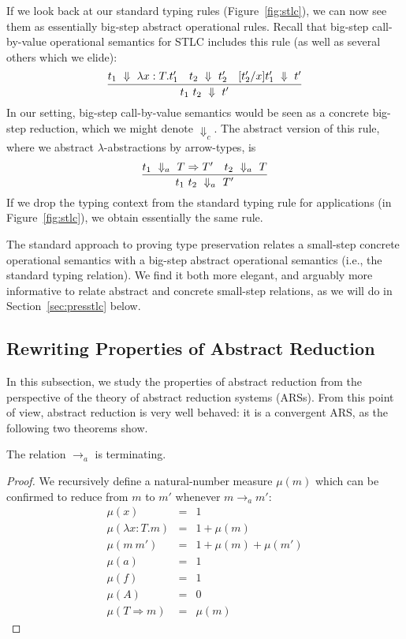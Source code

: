 \documentclass{LMCS}
\newcommand{\To}[0]{\Rightarrow}
\begin{document}
If we look back at our standard typing rules (Figure~\ref{fig:stlc}),
we can now see them as essentially big-step abstract operational
rules.  Recall that big-step call-by-value operational semantics for
STLC includes this rule (as well as several others which we elide):
\[
\infer{t_1\ t_2\ \Downarrow\ t'}{t_1\ \Downarrow\ \lambda x:T.t_1' & t_2\ \Downarrow\ t_2' & [t_2'/x]t_1'\ \Downarrow\ t'}
\]
\noindent In our setting, big-step call-by-value semantics would be
seen as a concrete big-step reduction, which we might denote
$\Downarrow_c$.  The abstract version of this rule, where we abstract
$\lambda$-abstractions by arrow-types, is
\[
\infer{t_1\ t_2\ \Downarrow_a\ T'}{t_1\ \Downarrow_a\ T\To T' & t_2\ \Downarrow_a\ T}
\]
\noindent If we drop the typing context from the standard typing rule
for applications (in Figure~\ref{fig:stlc}), we obtain essentially
the same rule.

The standard approach to proving type preservation relates a
small-step concrete operational semantics with a big-step abstract
operational semantics (i.e., the standard typing relation).  We find
it both more elegant, and arguably more informative to relate abstract
and concrete small-step relations, as we will do in Section~\ref{sec:presstlc} below.

\subsection{Rewriting Properties of Abstract Reduction}

In this subsection, we study the properties of abstract reduction from
the perspective of the theory of abstract reduction systems (ARSs).
From this point of view, abstract reduction is very well behaved: it
is a convergent ARS, as the following two theorems show.

\begin{thm}
\label{thm:termabstr}
The relation $\to_a$ is terminating.
\end{thm}
\begin{proof} We recursively define a natural-number measure $\mu(m)$ which can be confirmed to reduce from $m$ to $m'$ 
whenever $m\to_a m'$:
\begin{eqnarray*}
\mu(x) & = & 1 \\
\mu(\lambda x:T.m) & = & 1+\mu(m) \\
\mu(m\ m') & = & 1+\mu(m)+\mu(m') \\
\mu(a) & = & 1 \\
\mu(f) & = & 1 \\
\mu(A) & = & 0 \\
\mu(T \To m) & = & \mu(m)
\end{eqnarray*}
\end{proof}
\end{document}
